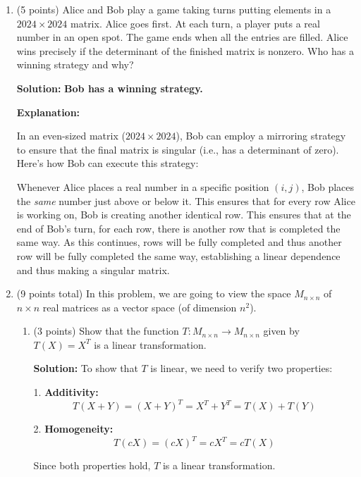 \documentclass[12pt]{article}
\newcommand{\qspace}{\vspace{1em}} %
\newenvironment{solution}{\noindent\textbf{Solution:} }{\qspace}
\begin{document}
\begin{enumerate}
    \item (5 points) Alice and Bob play a game taking turns putting elements in a $2024 \times 2024$ matrix. Alice goes first. At each turn, a player puts a real number in an open spot. The game ends when all the entries are filled. Alice wins precisely if the determinant of the finished matrix is nonzero. Who has a winning strategy and why?
        
         \begin{solution}
    \textbf{Bob has a winning strategy.}
    
    \textbf{Explanation:}
    
    In an even-sized matrix (\(2024 \times 2024\)), Bob can employ a mirroring strategy to ensure that the final matrix is singular (i.e., has a determinant of zero). Here's how Bob can execute this strategy:
    
 Whenever Alice places a real number in a specific position \((i, j)\), Bob places the \textit{same} number just above or below it. This ensures that for every row Alice is working on, Bob is creating another identical row. This ensures that at the end of Bob's turn, for each row, there is another row that is completed the same way. As this continues, rows will be fully completed and thus another row will be fully completed the same way, establishing a linear dependence and thus making a singular matrix.
        
        \end{solution}
        
    
    \item (9 points total) In this problem, we are going to view the space \( M_{n \times n} \) of \( n \times n \) real matrices as a vector space (of dimension \( n^2 \)).
    \begin{enumerate}
        \item (3 points) Show that the function \( T: M_{n \times n} \to M_{n \times n} \) given by \( T(X) = X^T \) is a linear transformation.
        
        \begin{solution}
        To show that \( T \) is linear, we need to verify two properties:

        1. \textbf{Additivity:}
        \[
        T(X + Y) = (X + Y)^T = X^T + Y^T = T(X) + T(Y)
        \]

        2. \textbf{Homogeneity:}
        \[
        T(cX) = (cX)^T = cX^T = cT(X)
        \]

        Since both properties hold, \( T \) is a linear transformation.
        \end{solution}
        

\end{enumerate}
\end{enumerate}
\end{document}
